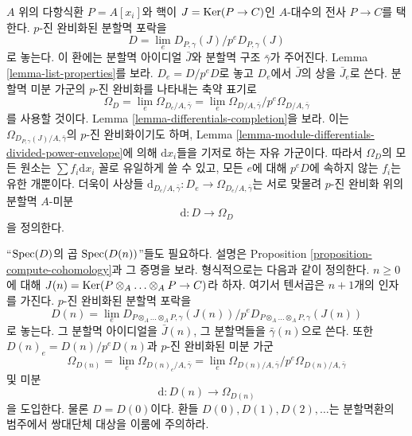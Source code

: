 \medskip\noindent
$A$ 위의 다항식환 $P = A[x_i]$와 핵이
$J = \mathop{\mathrm{Ker}}(P \to C)$인 $A$-대수의 전사 $P \to C$를 택한다.
$p$-진 완비화된 분할멱 포락을
\begin{equation}
\label{equation-D}
D = \lim_e D_{P, \gamma}(J) / p^eD_{P, \gamma}(J)
\end{equation}
로 놓는다. 이 환에는 분할멱 아이디얼 $\bar J$와 분할멱 구조
$\bar \gamma$가 주어진다. Lemma \ref{lemma-list-properties}를 보라.
$D_e = D/p^eD$로 놓고 $D_e$에서 $\bar J$의 상을 $\bar J_e$로 쓴다.
분할멱 미분 가군의 $p$-진 완비화를 나타내는 축약 표기로
\begin{equation}
\label{equation-omega-D}
\Omega_D = \lim_e \Omega_{D_e/A, \bar\gamma} =
\lim_e \Omega_{D/A, \bar\gamma}/p^e\Omega_{D/A, \bar\gamma}
\end{equation}
를 사용할 것이다. Lemma \ref{lemma-differentials-completion}을 보라.
이는 $\Omega_{D_{P, \gamma}(J)/A, \bar\gamma}$의 $p$-진
완비화이기도 하며, Lemma
\ref{lemma-module-differentials-divided-power-envelope}에 의해
$\text{d}x_i$들을 기저로 하는 자유 가군이다. 따라서
$\Omega_D$의 모든 원소는 $\sum f_i\text{d}x_i$ 꼴로 유일하게
쓸 수 있고, 모든 $e$에 대해 $p^eD$에 속하지 않는 $f_i$는
유한 개뿐이다. 더욱이 사상들
$\text{d}_{D_e/A, \bar\gamma} : D_e \to \Omega_{D_e/A, \bar\gamma}$는
서로 맞물려 $p$-진 완비화 위의 분할멱 $A$-미분
\begin{equation}
\label{equation-derivation-D}
\text{d} : D \longrightarrow \Omega_D
\end{equation}
을 정의한다.

\medskip\noindent
``$\mathop{\mathrm{Spec}}(D)$의 곱 $\mathop{\mathrm{Spec}}(D(n))$''들도 필요하다. 설명은 Proposition
\ref{proposition-compute-cohomology}과 그 증명을 보라. 형식적으로는
다음과 같이 정의한다. $n \geq 0$에 대해
$J(n) = \mathop{\mathrm{Ker}}(P \otimes_A \ldots \otimes_A P \to C)$라 하자.
여기서 텐서곱은 $n + 1$개의 인자를 가진다. $p$-진 완비화된
분할멱 포락을
\begin{equation}
\label{equation-Dn}
D(n) = \lim_e
D_{P \otimes_A \ldots \otimes_A P, \gamma}(J(n))/
p^eD_{P \otimes_A \ldots \otimes_A P, \gamma}(J(n))
\end{equation}
로 놓는다. 그 분할멱 아이디얼을 $\bar J(n)$, 그 분할멱들을
$\bar \gamma(n)$으로 쓴다. 또한 $D(n)_e = D(n)/p^eD(n)$과
$p$-진 완비화된 미분 가군
\begin{equation}
\label{equation-omega-Dn}
\Omega_{D(n)} = \lim_e \Omega_{D(n)_e/A, \bar\gamma} =
\lim_e \Omega_{D(n)/A, \bar\gamma}/p^e\Omega_{D(n)/A, \bar\gamma}
\end{equation}
및 미분
\begin{equation}
\label{equation-derivation-Dn}
\text{d} : D(n) \longrightarrow \Omega_{D(n)}
\end{equation}
을 도입한다. 물론 $D = D(0)$이다. 환들
$D(0), D(1), D(2), \ldots$는 분할멱환의 범주에서 쌍대단체 대상을
이룸에 주의하라.

